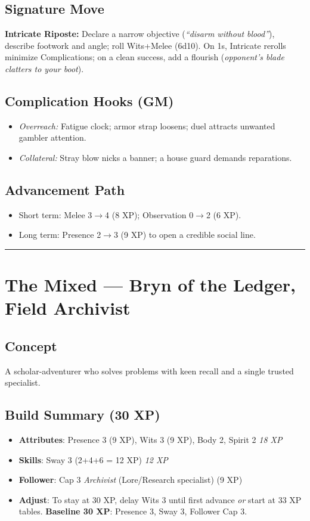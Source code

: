 \documentclass[12pt]{book}
\begin{document}
\subsection*{Signature Move}
\textbf{Intricate Riposte:} Declare a narrow objective (\emph{``disarm without blood''}), describe footwork and angle; roll Wits+Melee (6d10). On 1s, Intricate rerolls minimize Complications; on a clean success, add a flourish (\emph{opponent’s blade clatters to your boot}).

\subsection*{Complication Hooks (GM)}
\begin{itemize}
  \item \emph{Overreach:} Fatigue clock; armor strap loosens; duel attracts unwanted gambler attention.
  \item \emph{Collateral:} Stray blow nicks a banner; a house guard demands reparations.
\end{itemize}

\subsection*{Advancement Path}
\begin{itemize}
  \item Short term: Melee 3$\rightarrow$4 (8 XP); Observation 0$\rightarrow$2 (6 XP).
  \item Long term: Presence 2$\rightarrow$3 (9 XP) to open a credible social line.
\end{itemize}

\bigskip
\hrule
\bigskip

\section{The Mixed — Bryn of the Ledger, Field Archivist}

\subsection*{Concept}
A scholar-adventurer who solves problems with keen recall and a single trusted specialist.

\subsection*{Build Summary (30 XP)}
\begin{itemize}
  \item \textbf{Attributes}: Presence 3 (9 XP), Wits 3 (9 XP), Body 2, Spirit 2 \hfill \emph{18 XP}
  \item \textbf{Skills}: Sway 3 (2+4+6 = 12 XP) \hfill \emph{12 XP}
  \item \textbf{Follower}: Cap 3 \emph{Archivist} (Lore/Research specialist) (9 XP)
  \item \textbf{Adjust}: To stay at 30 XP, delay Wits 3 until first advance \emph{or} start at 33 XP tables. \textbf{Baseline 30 XP}: Presence 3, Sway 3, Follower Cap 3.
\end{itemize}
\end{document}
